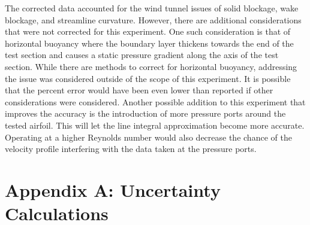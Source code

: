\documentclass[journal,letterpaper]{IEEEtran}
\begin{document}
The corrected data accounted for the wind tunnel issues of solid blockage, wake blockage, and streamline curvature.
However, there are additional considerations that were not corrected for this experiment.
One such consideration is that of horizontal buoyancy where the boundary layer thickens towards the end of the test section and causes a static pressure gradient along the axis of the test section.
While there are methods to correct for horizontal buoyancy, addressing the issue was considered outside of the scope of this experiment.
It is possible that the percent error would have been even lower than reported if other considerations were considered.
Another possible addition to this experiment that improves the accuracy is the introduction of more pressure ports around the tested airfoil.
This will let the line integral approximation become more accurate.
Operating at a higher Reynolds number would also decrease the chance of the velocity profile interfering with the data taken at the pressure ports.


\section*{Appendix A: Uncertainty Calculations}
\end{document}
